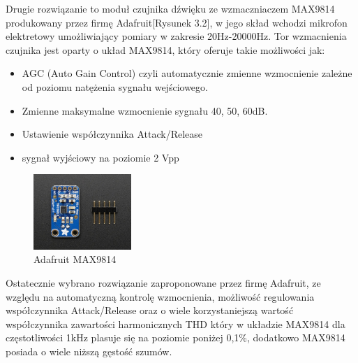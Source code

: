 \documentclass[eng,printmode]{mgr}
\begin{document}
 Drugie rozwiązanie to moduł czujnika dźwięku ze wzmaczniaczem MAX9814 produkowany przez firmę Adafruit[Rysunek 3.2], w jego skład wchodzi mikrofon elektretowy umożliwiający pomiary w zakresie 20Hz-20000Hz. Tor wzmacnienia czujnika jest oparty o układ MAX9814, który oferuje takie możliwości jak:
\begin{itemize}
\item AGC (Auto Gain Control) czyli automatycznie zmienne wzmocnienie zależne od poziomu natężenia sygnału wejściowego.
\item Zmienne maksymalne wzmocnienie sygnału 40, 50, 60dB. 
\item Ustawienie współczynnika Attack/Release 
\item sygnał wyjściowy na poziomie 2 Vpp
\end{itemize}
\newpage
\begin{figure}

    \centering

  \includegraphics[width=0.33\textwidth, angle=0]{detektor2.jpg}

    \caption{Adafruit MAX9814}

    

\end{figure}

Ostatecznie wybrano rozwiązanie zaproponowane przez firmę Adafruit, ze względu na automatyczną kontrolę wzmocnienia, możliwość regulowania współczynnika Attack/Release oraz o wiele korzystaniejszą wartość współczynnika zawartości harmonicznych THD który w układzie MAX9814 dla częstotliwości 1kHz plasuje się na poziomie poniżej 0,1\%, dodatkowo MAX9814 posiada o wiele niższą gęstość szumów.
\end{document}
